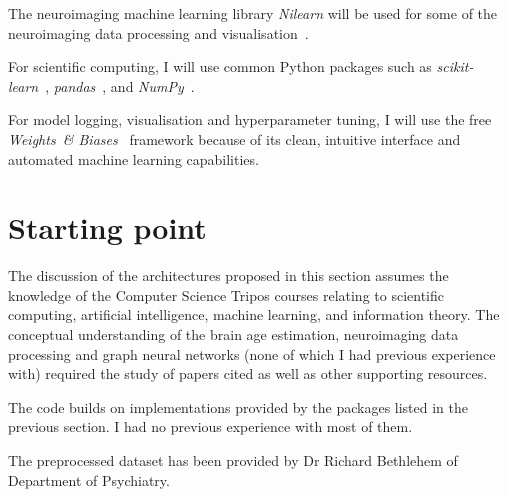 The neuroimaging machine learning library \textit{Nilearn} will be used for some of the neuroimaging data processing and visualisation~\cite{abraham2014machine, nilearn}.

For scientific computing, I will use common Python packages such as \textit{scikit-learn}~\cite{pedregosa2011scikit}, \textit{pandas}~\cite{mckinney2010scipy}, and \textit{NumPy}~\cite{walt2011numpy}. 

For model logging, visualisation and hyperparameter tuning, I will use the free \textit{Weights~\& Biases}~\cite{wandb} framework because of its clean, intuitive interface and automated machine learning capabilities.


\section{Starting point}
The discussion of the architectures proposed in this section assumes the knowledge of the Computer Science Tripos courses relating to scientific computing, artificial intelligence, machine learning, and information theory. The conceptual understanding of the brain age estimation, neuroimaging data processing and graph neural networks (none of which I had previous experience with) required the study of papers cited as well as other supporting resources.

The code builds on implementations provided by the packages listed in the previous section. I had no previous experience with most of them.

The preprocessed dataset has been provided by Dr Richard Bethlehem of Department of Psychiatry.